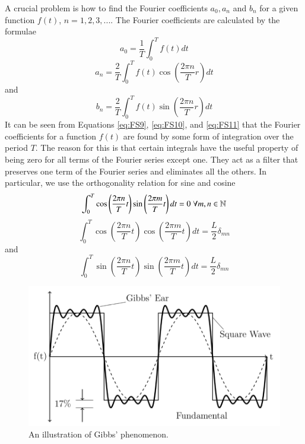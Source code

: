 \documentclass[12pt, a4paper, oneside, openright, titlepage]{book}
\begin{document}
\noindent A crucial problem is how to find the Fourier coefficients $a_0, a_n$ and $b_n$ for a given function $f(t)$, $n = 1,2,3,...$. The Fourier coefficients are calculated by the formulae \begin{equation}\label{eq:FS9}
    a_0 = \frac{1}{T}\int_0^Tf(t)dt
\end{equation}
\begin{equation}\label{eq:FS10}
    a_n = \frac{2}{T}\int_0^Tf(t)\cos\left(\frac{2\pi n}{T}r\right)dt 
\end{equation}
and \begin{equation}\label{eq:FS11}
    b_n = \frac{2}{T}\int_0^Tf(t)\sin\left(\frac{2\pi n}{T}r\right)dt 
\end{equation}
It can be seen from Equations \ref{eq:FS9}, \ref{eq:FS10}, and \ref{eq:FS11} that the Fourier coefficients for a function $f(t)$ are found by some form of integration over the period $T$. The reason for this is that certain integrals have the useful property of being zero for all terms of the Fourier series except one. They act as a filter that preserves one term of the Fourier series and eliminates all the others. In particular, we use the orthogonality relation for sine and cosine\begin{equation}\label{eq:FS12}
    \int_0^T\cos\left(\frac{2\pi n}{T}t\right)\sin\left(\frac{2\pi m}{T}t\right)dt = 0 \;\forall m,n \in \mathbb N
\end{equation}
\begin{equation}\label{eq:FS13}
    \int_0^T\cos\left(\frac{2\pi n}{T}t\right)\cos\left(\frac{2\pi m}{T}t\right)dt = \frac{L}{2}\delta_{mn}
\end{equation}
and \begin{equation}\label{eq:FS14}
    \int_0^T\sin\left(\frac{2\pi n}{T}t\right)\sin\left(\frac{2\pi m}{T}t\right)dt = \frac{L}{2}\delta_{mn}
\end{equation}


\begin{figure}[H]
    \centering
    \includegraphics[scale = 0.8]{Images/FS4.PNG}
    \caption{An illustration of Gibbs' phenomenon.}
    \label{fig:FS4}
\end{figure}
\end{document}
